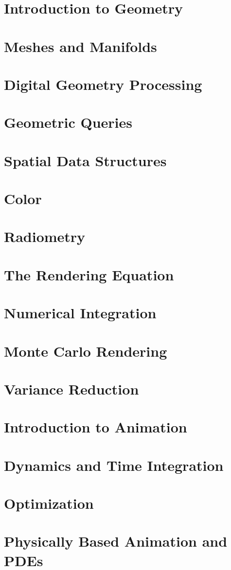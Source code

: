 \documentclass{article}
\begin{document}
\section{Introduction to Geometry}
\section{Meshes and Manifolds}
\section{Digital Geometry Processing}
\section{Geometric Queries}
\section{Spatial Data Structures}
\section{Color}
\section{Radiometry}
\section{The Rendering Equation}
\section{Numerical Integration}
\section{Monte Carlo Rendering}
\section{Variance Reduction}
\section{Introduction to Animation}
\section{Dynamics and Time Integration}
\section{Optimization}
\section{Physically Based Animation and PDEs}
\end{document}
